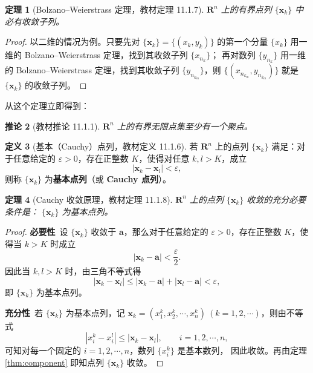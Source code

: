 \documentclass[11pt]{ctexart}
\theoremstyle{plain}
\newtheorem{thm}{定理}[section]
\newtheorem{cor}[thm]{推论}
\theoremstyle{definition}
\newtheorem{defn}[thm]{定义}
\theoremstyle{remark}
\begin{document}
\begin{thm}[Bolzano--Weierstrass 定理，教材定理 11.1.7]\label{thm:bw}
\(\mathbf{R}^n\) 上的有界点列 \(\{\boldsymbol{x}_k\}\) 中必有收敛子列。
\end{thm}

\begin{proof}
以二维的情况为例。只要先对 \(\{\boldsymbol{x}_k\}=\{(x_k,y_k)\}\) 的第一个分量
\(\{x_k\}\) 用一维的 Bolzano--Weierstrass 定理，找到其收敛子列 \(\{x_{n_k}\}\)；
再对数列 \(\{y_{n_k}\}\) 用一维的 Bolzano--Weierstrass 定理，找到其收敛子列
\(\{y_{n_{k_m}}\}\)，则 \(\{(x_{n_{k_m}},y_{n_{k_m}})\}\) 就是 \(\{\boldsymbol{x}_k\}\) 的收敛子列。
\end{proof}

从这个定理立即得到：

\begin{cor}[教材推论 11.1.1]\label{cor:accum}
\(\mathbf{R}^n\) 上的有界无限点集至少有一个聚点。
\end{cor}

\begin{defn}[基本（Cauchy）点列，教材定义 11.1.6]\label{def:cauchy}
若 \(\mathbf{R}^n\) 上的点列 \(\{\boldsymbol{x}_k\}\) 满足：对于任意给定的
\(\varepsilon>0\)，存在正整数 \(K\)，使得对任意 \(k,l>K\)，成立
\[
  |\boldsymbol{x}_k-\boldsymbol{x}_l|<\varepsilon,
\]
则称 \(\{\boldsymbol{x}_k\}\) 为\textbf{基本点列}（或 \textbf{Cauchy 点列}）。
\end{defn}

\begin{thm}[Cauchy 收敛原理，教材定理 11.1.8]\label{thm:cauchy}
\(\mathbf{R}^n\) 上的点列 \(\{\boldsymbol{x}_k\}\) 收敛的充分必要条件是：
\(\{\boldsymbol{x}_k\}\) 为基本点列。
\end{thm}

\begin{proof}
\textbf{必要性}\ 设 \(\{\boldsymbol{x}_k\}\) 收敛于 \(\boldsymbol{a}\)，那么对于任意给定的
\(\varepsilon>0\)，存在正整数 \(K\)，使得当 \(k>K\) 时成立
\[
  |\boldsymbol{x}_k-\boldsymbol{a}|<\frac{\varepsilon}{2}.
\]
因此当 \(k,l>K\) 时，由三角不等式得
\[
  |\boldsymbol{x}_k-\boldsymbol{x}_l|\le|\boldsymbol{x}_k-\boldsymbol{a}|
  +|\boldsymbol{x}_l-\boldsymbol{a}|<\varepsilon,
\]
即 \(\{\boldsymbol{x}_k\}\) 为基本点列。

\textbf{充分性}\ 若 \(\{\boldsymbol{x}_k\}\) 为基本点列，记
\(\boldsymbol{x}_k=(x_1^k,x_2^k,\cdots,x_n^k)\ (k=1,2,\cdots)\)，则由不等式
\[
  |x_i^k-x_i^l|\le|\boldsymbol{x}_k-\boldsymbol{x}_l|,\qquad i=1,2,\cdots,n,
\]
可知对每一个固定的 \(i=1,2,\cdots,n\)，数列 \(\{x_i^k\}\) 是基本数列，
因此收敛。再由定理 \ref{thm:component} 即知点列 \(\{\boldsymbol{x}_k\}\) 收敛。
\end{proof}
\end{document}
